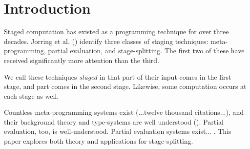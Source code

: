 \section{Introduction}

Staged computation has existed as a programming technique for over three decades.  Jorring et al. (\cite{jorring86}) identify three classes of staging techniques: meta-programming, partial evaluation, and stage-splitting.  The first two of these have received significantly more attention than the third.

We call these techniques {\em staged} in that part of their input comes in the first stage, and part comes in the second stage.  Likewise, some computation occurs at each stage as well.

Countless meta-programming systems exist (...twelve thousand citations...\cite{devito13}), and their background theory and type-systems are well understood (\cite{davies01}).  Partial evaluation, too, is well-understood.  Partial evaluation systems exist... . This paper explores both theory and applications for stage-splitting.  
